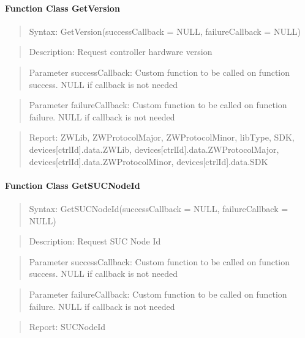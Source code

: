 \paragraph{Function Class GetVersion}
\begin{quote}Syntax: GetVersion(successCallback = NULL, failureCallback = NULL)\end{quote}
\begin{quote}Description: Request controller hardware version\end{quote}
\begin{quote}Parameter successCallback: Custom function to be called on function success. NULL if callback is not needed\end{quote}
\begin{quote}Parameter failureCallback: Custom function to be called on function failure. NULL if callback is not needed\end{quote}
\begin{quote}Report: ZWLib, ZWProtocolMajor, ZWProtocolMinor, libType, SDK, devices[ctrlId].data.ZWLib, devices[ctrlId].data.ZWProtocolMajor, devices[ctrlId].data.ZWProtocolMinor, devices[ctrlId].data.SDK\end{quote}

\paragraph{Function Class GetSUCNodeId}
\begin{quote}Syntax: GetSUCNodeId(successCallback = NULL, failureCallback = NULL)\end{quote}
\begin{quote}Description: Request SUC Node Id\end{quote}
\begin{quote}Parameter successCallback: Custom function to be called on function success. NULL if callback is not needed\end{quote}
\begin{quote}Parameter failureCallback: Custom function to be called on function failure. NULL if callback is not needed\end{quote}
\begin{quote}Report: SUCNodeId\end{quote}

